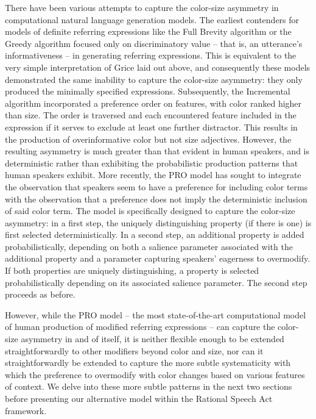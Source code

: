 \documentclass[11pt]{article}
\begin{document}
There have been various attempts to capture the color-size asymmetry in computational natural language generation models. The earliest contenders for models of definite referring expressions like the Full Brevity algorithm \cite{Dale1989} or the Greedy algorithm \cite{Dale1989} focused only on discriminatory value -- that is, an utterance's informativeness -- in generating referring expressions. This is equivalent to the very simple interpretation of Grice laid out above, and consequently these models demonstrated the same inability to capture the color-size asymmetry: they only produced the minimally specified expressions. Subsequently, the Incremental algorithm \cite{dale1995} incorporated a preference order on features, with color ranked higher than size. The order is traversed and each encountered feature included in the expression if it serves to exclude at least one further distractor. This results in the production of overinformative color but not size adjectives. However, the resulting asymmetry is much greater than that evident in human speakers, and is deterministic rather than exhibiting the probabilistic production patterns that human speakers exhibit. More recently, the PRO model \cite{GattEtAl2013} has sought to integrate the observation that speakers seem to have a preference for including color terms with the observation that a preference does not imply the deterministic inclusion of said color term. The model is specifically designed to capture the color-size asymmetry: in a first step, the uniquely distinguishing property (if there is one) is first selected deterministically. In a second step, an additional property is added probabilistically, depending on both a salience parameter associated with the additional property and a parameter capturing speakers' eagerness to overmodify. If both properties are uniquely distinguishing, a property is selected probabilistically depending on its associated salience parameter. The second step proceeds as before.

However, while the PRO model -- the most state-of-the-art computational model of human production of modified referring expressions -- can capture the color-size asymmetry in and of itself, it is neither flexible enough to be extended straightforwardly to other modifiers beyond color and size, nor can it straightforwardly be extended to capture the more subtle systematicity with which the preference to overmodify with color changes based on various features of context. We delve into these more subtle patterns in the next two sections before presenting our alternative model within the Rational Speech Act framework.
\end{document}
